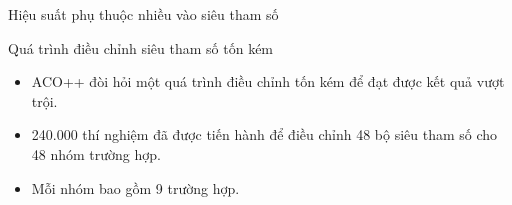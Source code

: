 \documentclass[aspectratio=169]{beamer}
\begin{document}
\begin{frame}{Hiệu suất phụ thuộc nhiều vào siêu tham số}
    \begin{block}{Quá trình điều chỉnh siêu tham số tốn kém}
        \begin{itemize}
            \vspace{0.1cm}
            \item ACO++ đòi hỏi một quá trình điều chỉnh tốn kém để đạt được kết quả vượt trội.
            \vspace{0.1cm}
            \item 240.000 thí nghiệm đã được tiến hành để điều chỉnh 48 bộ siêu tham số cho 48 nhóm trường hợp.
            \vspace{0.1cm}
            \item Mỗi nhóm bao gồm 9 trường hợp.
            \vspace{0.1cm}
        \end{itemize}
    \end{block}


\end{frame}
\end{document}
